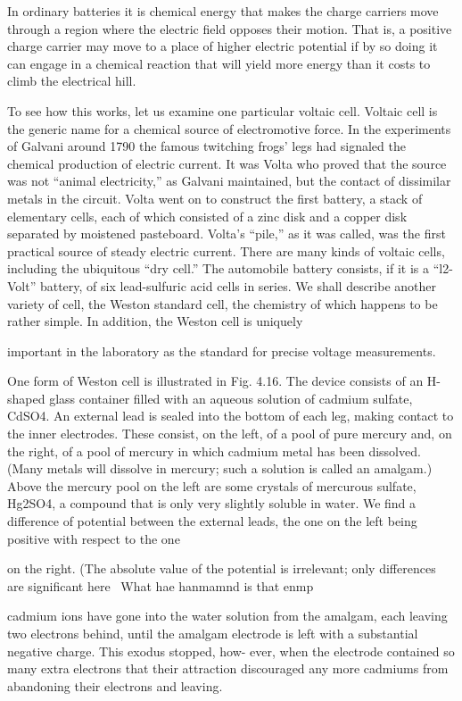 In ordinary batteries it is chemical energy that makes the charge
carriers move through a region where the electric field opposes their
motion. That is, a positive charge carrier may move to a place of
higher electric potential if by so doing it can engage in a chemical
reaction that will yield more energy than it costs to climb the electrical
hill.

To see how this works, let us examine one particular voltaic cell.
Voltaic cell is the generic name for a chemical source of electromotive
force. In the experiments of Galvani around 1790 the famous
twitching frogs' legs had signaled the chemical production of electric
current. It was Volta who proved that the source was not ``animal
electricity,'' as Galvani maintained, but the contact of dissimilar
metals in the circuit. Volta went on to construct the first battery, a
stack of elementary cells, each of which consisted of a zinc disk and
a copper disk separated by moistened pasteboard. Volta's ``pile,'' as
it was called, was the first practical source of steady electric current.
There are many kinds of voltaic cells, including the ubiquitous ``dry
cell.'' The automobile battery consists, if it is a ``l2-Volt'' battery, of
six lead-sulfuric acid cells in series. We shall describe another
variety of cell, the Weston standard cell, the chemistry of which
happens to be rather simple. In addition, the Weston cell is uniquely

important in the laboratory as the standard for precise voltage
measurements.

One form of Weston cell is illustrated in Fig. 4.16. The device
consists of an H-shaped glass container filled with an aqueous solution
of cadmium sulfate, CdSO4. An external lead is sealed into the
bottom of each leg, making contact to the inner electrodes. These
consist, on the left, of a pool of pure mercury and, on the right, of a
pool of mercury in which cadmium metal has been dissolved.
(Many metals will dissolve in mercury; such a solution is called an
amalgam.) Above the mercury pool on the left are some crystals of
mercurous sulfate, Hg2SO4, a compound that is only very slightly
soluble in water. We find a difference of potential between the external
leads, the one on the left being positive with respect to the one

on the right. (The absolute value of the potential is irrelevant; only
differences are significant here \ What hae hanmamnd is that enmp

cadmium ions have gone into the water solution from the amalgam,
each leaving two electrons behind, until the amalgam electrode is
left with a substantial negative charge. This exodus stopped, how-
ever, when the electrode contained so many extra electrons that their
attraction discouraged any more cadmiums from abandoning their
electrons and leaving.

